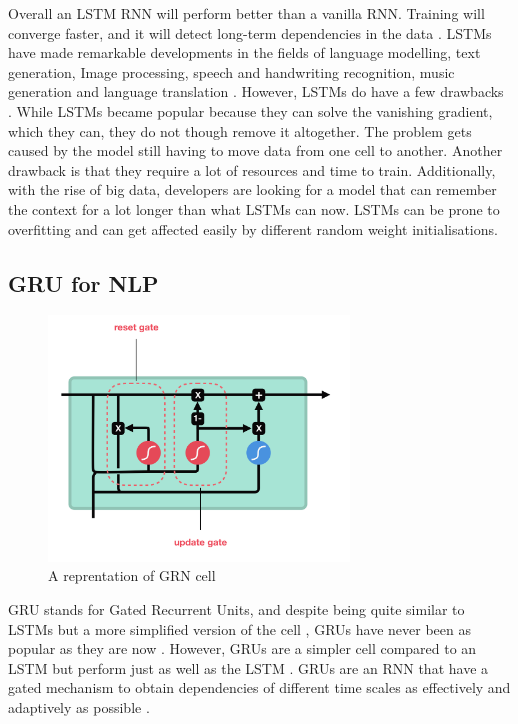 \documentclass[a4paper,10pt]{article}
\begin{document}
	Overall an LSTM RNN will perform better than a vanilla RNN.  Training will converge faster, and it will detect long-term dependencies in the data \cite{geron2019hands}. LSTMs have made remarkable developments in the fields of language modelling, text generation, Image processing, speech and handwriting recognition, music generation and language translation \cite{g4g}. However, LSTMs do have a few drawbacks \cite{g4g}. While LSTMs became popular because they can solve the vanishing gradient, which they can, they do not though remove it altogether. The problem gets caused by the model still having to move data from one cell to another. Another drawback is that they require a lot of resources and time to train. Additionally, with the rise of big data, developers are looking for a model that can remember the context for a lot longer than what LSTMs can now. LSTMs can be prone to overfitting and can get affected easily by different random weight initialisations.
	
\subsection{GRU for NLP}

	\begin{figure}
		\begin{center}
			\includegraphics[width=8cm]{GRU_example.png}
			\caption{A reprentation of GRN cell \cite{illustrated_lstm_gru}}
			\label{fig:gru_example}
		\end{center}
	\end{figure}

	GRU stands for Gated Recurrent Units, and despite being quite similar to LSTMs but a more simplified version of the cell \cite{geron2019hands, grus2019data}, GRUs have never been as popular as they are now \cite{g4g, geron2019hands}. However, GRUs are a simpler cell compared to an LSTM but perform just as well as the LSTM \cite{greff2016lstm}. GRUs are an RNN that have a gated mechanism to obtain dependencies of different time scales as effectively and adaptively as possible \cite{cho2014learning}. 
	
\end{document}
